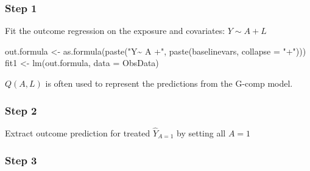 \documentclass[
]{book}
\newenvironment{Shaded}{\begin{snugshade}}{\end{snugshade}}
\newcommand{\AttributeTok}[1]{\textcolor[rgb]{0.77,0.63,0.00}{#1}}
\newcommand{\DecValTok}[1]{\textcolor[rgb]{0.00,0.00,0.81}{#1}}
\newcommand{\FunctionTok}[1]{\textcolor[rgb]{0.00,0.00,0.00}{#1}}
\newcommand{\NormalTok}[1]{#1}
\newcommand{\OtherTok}[1]{\textcolor[rgb]{0.56,0.35,0.01}{#1}}
\newcommand{\SpecialCharTok}[1]{\textcolor[rgb]{0.00,0.00,0.00}{#1}}
\newcommand{\StringTok}[1]{\textcolor[rgb]{0.31,0.60,0.02}{#1}}
\begin{document}
\hypertarget{step-1}{%
\subsubsection{Step 1}\label{step-1}}

Fit the outcome regression on the exposure and covariates: \(Y \sim A + L\)

\begin{Shaded}
\begin{Highlighting}[]
\NormalTok{out.formula }\OtherTok{\textless{}{-}} \FunctionTok{as.formula}\NormalTok{(}\FunctionTok{paste}\NormalTok{(}\StringTok{"Y\textasciitilde{} A +"}\NormalTok{,}
                               \FunctionTok{paste}\NormalTok{(baselinevars,}
                                     \AttributeTok{collapse =} \StringTok{"+"}\NormalTok{)))}
\NormalTok{fit1 }\OtherTok{\textless{}{-}} \FunctionTok{lm}\NormalTok{(out.formula, }\AttributeTok{data =}\NormalTok{ ObsData)}
\end{Highlighting}
\end{Shaded}

\begin{rmdcomment}
\(Q(A,L)\) is often used to represent the predictions from the G-comp
model.
\end{rmdcomment}

\hypertarget{step-2}{%
\subsubsection{Step 2}\label{step-2}}

Extract outcome prediction for treated \(\hat{Y}_{A=1}\) by setting all \(A=1\)\textbar{}

\begin{Shaded}
\end{Shaded}

\hypertarget{step-3}{%
\subsubsection{Step 3}\label{step-3}}
\end{document}
